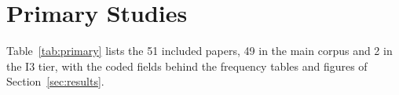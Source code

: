 \section{Primary Studies}
\label{app:primary}

Table~\ref{tab:primary} lists the 51 included papers, 49 in the main corpus and 2 in the I3 tier, with the coded fields behind the frequency tables and figures of Section~\ref{sec:results}.

